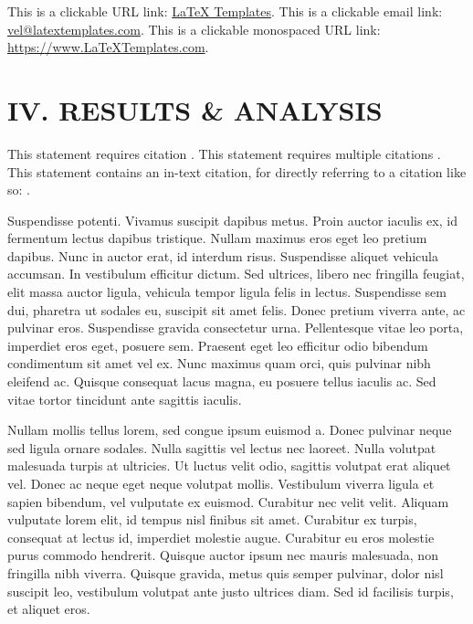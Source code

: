 \documentclass[
	letterpaper, %
	10pt, %
	unnumberedsections, %
	twoside, %
]{LTJournalArticle}
\begin{document}
This is a clickable URL link: \href{https://www.latextemplates.com}{LaTeX Templates}. This is a clickable email link: \href{mailto:vel@latextemplates.com}{vel@latextemplates.com}. This is a clickable monospaced URL link: \url{https://www.LaTeXTemplates.com}.


\section{IV. RESULTS \& ANALYSIS}

This statement requires citation \autocite{Smith:2023qr}. This statement requires multiple citations \autocite{Smith:2023qr, Smith:2024jd}. This statement contains an in-text citation, for directly referring to a citation like so: \textcite{Smith:2024jd}.

Suspendisse potenti. Vivamus suscipit dapibus metus. Proin auctor iaculis ex, id fermentum lectus dapibus tristique. Nullam maximus eros eget leo pretium dapibus. Nunc in auctor erat, id interdum risus. Suspendisse aliquet vehicula accumsan. In vestibulum efficitur dictum. Sed ultrices, libero nec fringilla feugiat, elit massa auctor ligula, vehicula tempor ligula felis in lectus. Suspendisse sem dui, pharetra ut sodales eu, suscipit sit amet felis. Donec pretium viverra ante, ac pulvinar eros. Suspendisse gravida consectetur urna. Pellentesque vitae leo porta, imperdiet eros eget, posuere sem. Praesent eget leo efficitur odio bibendum condimentum sit amet vel ex. Nunc maximus quam orci, quis pulvinar nibh eleifend ac. Quisque consequat lacus magna, eu posuere tellus iaculis ac. Sed vitae tortor tincidunt ante sagittis iaculis.

Nullam mollis tellus lorem, sed congue ipsum euismod a. Donec pulvinar neque sed ligula ornare sodales. Nulla sagittis vel lectus nec laoreet. Nulla volutpat malesuada turpis at ultricies. Ut luctus velit odio, sagittis volutpat erat aliquet vel. Donec ac neque eget neque volutpat mollis. Vestibulum viverra ligula et sapien bibendum, vel vulputate ex euismod. Curabitur nec velit velit. Aliquam vulputate lorem elit, id tempus nisl finibus sit amet. Curabitur ex turpis, consequat at lectus id, imperdiet molestie augue. Curabitur eu eros molestie purus commodo hendrerit. Quisque auctor ipsum nec mauris malesuada, non fringilla nibh viverra. Quisque gravida, metus quis semper pulvinar, dolor nisl suscipit leo, vestibulum volutpat ante justo ultrices diam. Sed id facilisis turpis, et aliquet eros.
\end{document}
